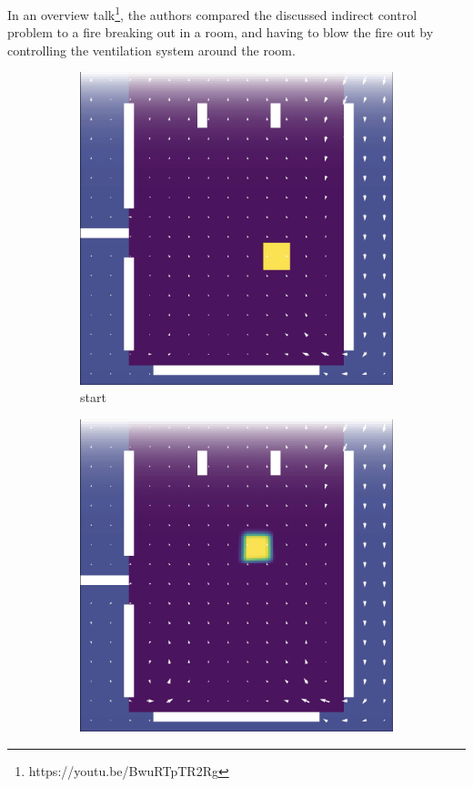 \documentclass[acmtog]{techreportacmart}
\begin{document}
In an overview talk\footnote{https://youtu.be/BwuRTpTR2Rg}, the authors compared
the discussed indirect control problem to a fire breaking out in a room, and
having to blow the fire out by controlling the ventilation system around the
room. 

\begin{figure}
  \label{fig:indirect}
  \centering
  \begin{subfigure}{0.15\textwidth}
    \centering
    \includegraphics[width=\textwidth]{indirect_start.png}
    \caption{start}
    \label{fig:indirect-a}
  \end{subfigure}
  \begin{subfigure}{0.15\textwidth}
    \centering
    \includegraphics[width=\textwidth]{indirect_middle.png}

\end{subfigure}
\end{figure}
\end{document}
